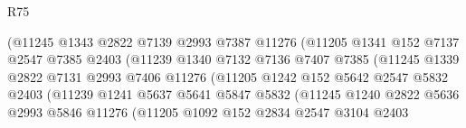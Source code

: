 \begin{lexlean}{R75}
\begin{coremodule}
                                  (@11245
                                    @1343
                                    @2822
                                    @7139
                                    @2993
                                    @7387
                                    @11276
                                    (@11205
                                      @1341
                                      @152
                                      @7137
                                      @2547
                                      @7385
                                      @2403
                                      (@11239
                                        @1340
                                        @7132
                                        @7136
                                        @7407
                                        @7385
                                        (@11245
                                          @1339
                                          @2822
                                          @7131
                                          @2993
                                          @7406
                                          @11276
                                          (@11205
                                            @1242
                                            @152
                                            @5642
                                            @2547
                                            @5832
                                            @2403
                                            (@11239
                                              @1241
                                              @5637
                                              @5641
                                              @5847
                                              @5832
                                              (@11245
                                                @1240
                                                @2822
                                                @5636
                                                @2993
                                                @5846
                                                @11276
                                                (@11205
                                                  @1092
                                                  @152
                                                  @2834
                                                  @2547
                                                  @3104
                                                  @2403

\end{coremodule}
\end{lexlean}
